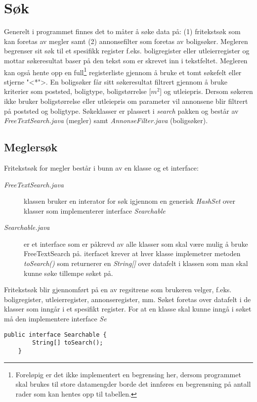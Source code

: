 \section{Søk} \label{sec:sok}
Generelt i programmet finnes det to måter å søke data på: (1) fritekstsøk som kan foretas av megler samt (2) annonsefilter som foretas av boligsøker. Megleren begrenser sit søk til et spesifikk register f.eks. boligregister eller utleierregister og mottar søkeresultat baser på den tekst som er skrevet inn i tekstfeltet. Megleren kan også hente opp en full\footnote{Foreløpig er det ikke implementert en begrensing her, dersom programmet skal brukes til store datamengder borde det innføres en begrensning på antall rader som kan hentes opp til tabellen.} registerliste gjennom å bruke et tomt søkefelt eller stjerne "<*">. 
En boligsøker får sitt søkeresultat filtrert gjennom å bruke kriterier som poststed, boligtype, boligstørrelse [$m^2$] og utleiepris. Dersom søkeren ikke bruker boligstørrelse eller utleiepris om parameter vil annonsene blir filtrert på poststed og boligtype.
Søkeklasser er plassert i \emph{search} pakken og består av \emph{FreeTextSearch.java} (megler) samt \emph{AnnonseFilter.java} (boligsøker).

\subsection{Meglersøk}
Fritekstsøk for megler består i bunn av en klasse og et interface:
\begin{description}
\item[\emph{FreeTextSearch.java}] klassen bruker en interator for søk igjennom en generisk \emph{HashSet} over klasser som implementerer interface \emph{Searchable}
\item[\emph{Searchable.java}] er et interface som er påkrevd av alle klasser som skal være mulig å bruke FreeTextSearch på. iterfacet krever at hver klasse implemetrer metoden \emph{toSearch()} som returnerer en \emph{String[]} over datafelt i klassen som man skal kunne søke tillempe søket på.
\end{description}

Fritekstsøk blir gjennomført på en av regsitrene som brukeren velger, f.eks. boligregister, utleierregister, annonseregister, mm. Søket foretas over datafelt i de klasser som inngår i et spesifikt register. For at en klasse skal kunne inngå i søket må den implementere interface \emph{Se}

\begin{lstlisting}[caption=Oversikt over \emph{Searchable} interface, label=kode:msg1]
	public interface Searchable {
   		String[] toSearch();
	}
\end{lstlisting}

